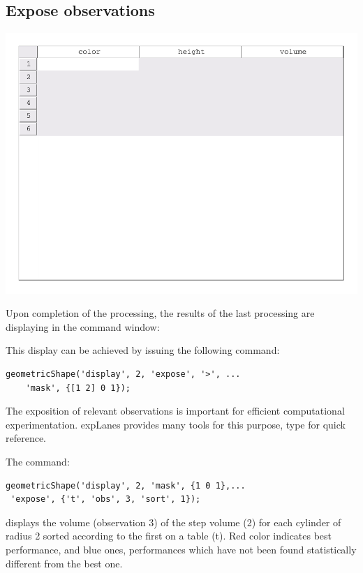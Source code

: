 \documentclass[a4paper,fleqn]{tufte-handout}
\newcommand{\explanes}{\textsf{expLanes} }
\begin{document}
\subsection{Expose observations}

\begin{marginfigure}
\includegraphics[trim={0 6cm 0 0},clip,width=1.2\textwidth]{../demo/geometricShape/report/figures/mtable}
\end{marginfigure}

Upon completion of the processing, the results of the last processing are displaying in the command window:

This display can be achieved by issuing the following command:
\begin{lstlisting}
geometricShape('display', 2, 'expose', '>', ...
	'mask', {[1 2] 0 1});
\end{lstlisting}
The exposition of relevant observations is important for efficient computational experimentation. \explanes provides many tools for this purpose, type  for quick reference. 


The command:
\begin{lstlisting}
geometricShape('display', 2, 'mask', {1 0 1},...
 'expose', {'t', 'obs', 3, 'sort', 1});
\end{lstlisting}

displays the volume (observation 3) of the step volume (2) for each cylinder of radius 2 sorted according to the first on a table (t). Red color indicates best performance, and blue ones, performances which have not been found statistically different from the best one. 
\end{document}
